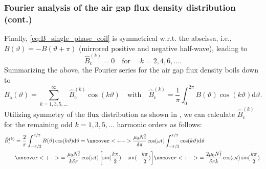 \begin{frame}
	\frametitle{Fourier analysis of the air gap flux density distribution (cont.)}
        \onslide<+-> Finally, \eqref{eq:B_single_phase_coil} is symmetrical w.r.t. the abscissa, i.e., $B(\vartheta)=-B(\vartheta+\pi)$ (mirrored positive and negative half-wave), leading to
        $$\hat{B}_{\mathrm{c}}^{(k)} = 0 \quad \mbox{for } \quad k=2,4,6,\ldots .$$ \onslide<+->
        Summarizing the above, the Fourier series for the air gap flux density boils down to
        \begin{equation}
            B_\mathrm{a}(\vartheta) = \sum_{k=1,3,5,\ldots}^{\infty} \hat{B}_{\mathrm{c}}^{(k)} \cos(k \vartheta) \quad \mbox{with} \quad \hat{B}_{\mathrm{c}}^{(k)} = \frac{1}{\pi} \int_{0}^{2 \pi} B(\vartheta) \cos(k \vartheta) \mathrm{d}\vartheta.
            \label{eq:fourier_series_B_single_phase_coil_reduced}
        \end{equation} \onslide<+->
        Utilizing symmetry of the flux distribution as shown in , we can calculate $\hat{B}_{\mathrm{c}}^{(k)}$ for the remaining odd $k=1,3,5,\ldots$ harmonic orders as follows:
        \begin{equation}
            \begin{split}
                \hat{B}_{\mathrm{c}}^{(k)} &= \frac{2}{\pi} \int_{-\pi/2}^{\pi/2} B(\vartheta) \cos(k \vartheta) \mathrm{d}\vartheta =  \uncover<+->{\frac{\mu_0 N \hat{i}}{\delta \pi } \cos(\omega t) \int_{-\pi/2}^{\pi/2} \cos(k \vartheta) \mathrm{d}\vartheta} \\ &\uncover<+->{= \frac{\mu_0 N \hat{i}}{k \delta \pi } \cos(\omega t) \left[ \sin(\frac{k \pi}{2}) - \sin(-\frac{k \pi}{2}) \right]}\uncover<+->{= \frac{2 \mu_0 N \hat{i}}{\delta \pi k} \cos(\omega t) \sin(\frac{k \pi}{2}).}
            \end{split}
            \label{eq:B_single_phase_coil_fourier_series_coefficients}
        \end{equation}
\end{frame}

